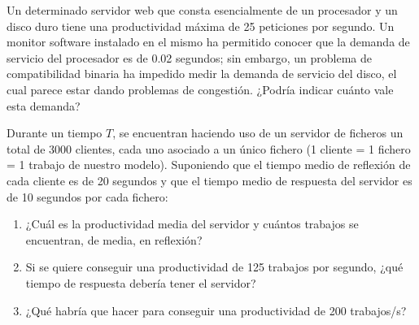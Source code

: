 \begin{ejercicio}\label{ej:5.9}
    Un determinado servidor web que consta esencialmente de un procesador y un disco duro tiene una productividad máxima de 25 peticiones por segundo. Un monitor software instalado en el mismo ha permitido conocer que la demanda de servicio del procesador es de 0.02 segundos; sin embargo, un problema de compatibilidad binaria ha impedido medir la demanda de servicio del disco, el cual parece estar dando problemas de congestión. ¿Podría indicar cuánto vale esta demanda?
\end{ejercicio}
\begin{comment}
\solucion
    La demanda de servicio del disco es 0.04 segundos/petición por ser éste el cuello de botella.
\end{comment}

\begin{ejercicio}\label{ej:5.10}
    Durante un tiempo $T$, se encuentran haciendo uso de un servidor de ficheros un total de 3000 clientes, cada uno asociado a un único fichero (1 cliente = 1 fichero = 1 trabajo de nuestro modelo). Suponiendo que el tiempo medio de reflexión de cada cliente es de 20 segundos y que el tiempo medio de respuesta del servidor es de 10 segundos por cada fichero:
    \begin{enumerate}
        \item ¿Cuál es la productividad media del servidor y cuántos trabajos se encuentran, de media, en reflexión?
        \item Si se quiere conseguir una productividad de 125 trabajos por segundo, ¿qué tiempo de respuesta debería tener el servidor?
        \item ¿Qué habría que hacer para conseguir una productividad de 200 trabajos/s?
    \end{enumerate}
\end{ejercicio}
\begin{comment}
\solucion
    \begin{enumerate}
        \item $X_0 = 100$ tr/s, $N_z = 2000$ tr.
        \item $R_0 = 4$ s.
        \item Tal y como está diseñado el servidor (con ese número de clientes y ese tiempo medio de reflexión), no se puede alcanzar una productividad media de 200 tr/s. En el caso límite de que $R_0 = 0$ s, $X_0$ sería 150 tr/s.
    \end{enumerate}
\end{comment}

